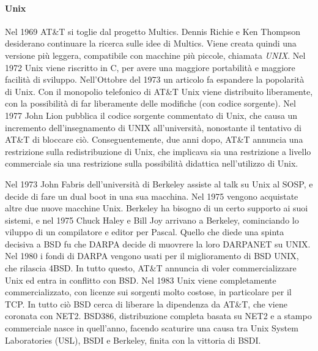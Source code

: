\paragraph*{Unix} Nel 1969 AT\&T si toglie dal progetto Multics. Dennis Richie e Ken Thompson desiderano continuare la ricerca sulle idee di Multics. Viene creata quindi una versione pi\`u leggera, compatibile con macchine pi\`u piccole, chiamata \textit{UNIX}. Nel 1972 Unix viene riscritto in C, per avere una maggiore portabilit\`a e maggiore facilit\`a di sviluppo. Nell'Ottobre del 1973 un articolo fa espandere la popolarit\`a di Unix.
Con il monopolio telefonico di AT\&T Unix viene distribuito liberamente, con la possibilit\`a di far liberamente delle modifiche (con codice sorgente). Nel 1977 John Lion pubblica il codice sorgente commentato di Unix, che causa un incremento dell'insegnamento di UNIX all'universit\`a, nonostante il tentativo di AT\&T di bloccare ci\`o. Conseguentemente, due anni dopo, AT\&T annuncia una restrizione sulla redistribuzione di Unix, che implicava sia una restrizione a livello commerciale sia una restrizione sulla possibilit\`a didattica nell'utilizzo di Unix.

Nel 1973 John Fabris dell'universit\`a di Berkeley assiste al talk su Unix al SOSP, e decide di fare un dual boot in una sua macchina. Nel 1975 vengono acquistate altre due nuove macchine Unix. Berkeley ha bisogno di un certo supporto ai suoi sistemi, e nel 1975 Chuck Haley e Bill Joy arrivano a Berkeley, cominciando lo viluppo di un compilatore e editor per Pascal. Quello che diede una spinta decisiva a BSD fu che DARPA decide di muovrere la loro DARPANET su UNIX. Nel 1980 i fondi di DARPA vengono usati per il miglioramento di BSD UNIX, che rilascia 4BSD. In tutto questo, AT\&T annuncia di voler commercializzare Unix ed entra in conflitto con BSD. Nel 1983 Unix viene completamente commercializzato, con licenze sui sorgenti molto costose, in particolare per il TCP. In tutto ci\`o BSD cerca di liberare la dipendenza da AT\&T, che viene coronata con NET2. BSD386, distribuzione completa basata su NET2 e a stampo commerciale nasce in quell'anno, facendo scaturire una causa tra Unix System Laboratories (USL), BSDI e Berkeley, finita con la vittoria di BSDI.
